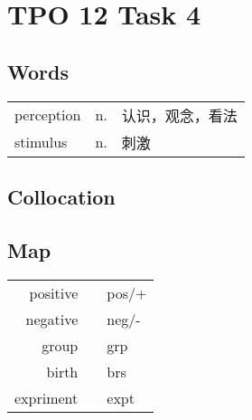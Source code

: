 \section{TPO 12 Task 4}

\subsection{Words}

\begin{tabular}{lll}
    perception & n. & 认识，观念，看法 \\
    stimulus   & n. & 刺激       \\
\end{tabular}

\subsection{Collocation}

\subsection{Map}

\begin{tabular}{rc@{\quad$\to$\quad}l}
    positive  &  & pos/+ \\
    negative  &  & neg/- \\
    group     &  & grp   \\
    birth     &  & brs   \\
    expriment &  & expt  \\
\end{tabular}
